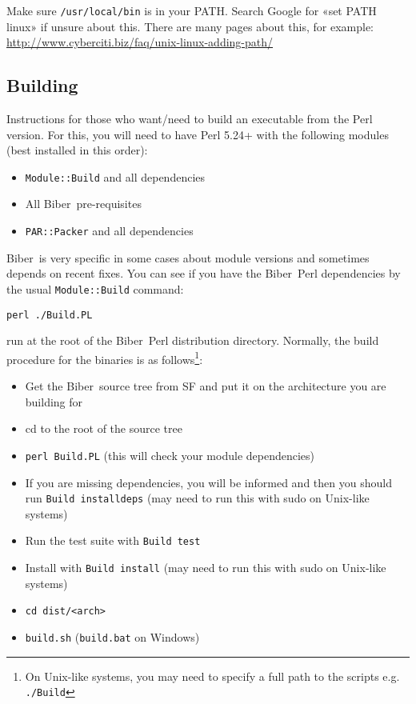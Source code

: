 \documentclass{ltxdockit}
\newcommand*{\biber}{Biber\xspace}
\begin{document}
\noindent Make sure \verb+/usr/local/bin+ is in your PATH. Search Google for «set PATH
linux» if unsure about this. There are many pages about this, for example:
\url{http://www.cyberciti.biz/faq/unix-linux-adding-path/}

\subsection{Building}

Instructions for those who want/need to build an executable from the
Perl version. For this, you will need to have Perl 5.24+ with
the following modules (best installed in this order):

\begin{itemize}
\item \verb+Module::Build+ and all dependencies
\item All \biber\ pre-requisites
\item \verb+PAR::Packer+ and all dependencies
\end{itemize}

\noindent \biber\ is very specific in some cases about module versions and
sometimes depends on recent fixes. You can see if you have the
\biber\ Perl dependencies by the usual \verb+Module::Build+ command:

\begin{verbatim}
perl ./Build.PL
\end{verbatim}

\noindent run at the root of the \biber\ Perl distribution
directory. Normally, the build procedure for the binaries is as
follows\footnote{On Unix-like systems, you may need to specify a full
  path to the scripts e.g. \texttt{./Build}}:

\begin{itemize}
\item Get the \biber\ source tree from SF and put it on the architecture
  you are building for
\item cd to the root of the source tree
\item \verb+perl Build.PL+ (this will check your module dependencies)
\item If you are missing dependencies, you will be informed and then you
  should run \verb+Build installdeps+ (may need to run this with sudo on
  Unix-like systems)
\item Run the test suite with \verb+Build test+
\item Install with \verb+Build install+ (may need to run this with sudo on
  Unix-like systems)
\item \verb+cd dist/<arch>+
\item \verb+build.sh+ (\verb+build.bat+ on Windows)
\end{itemize}
\end{document}
